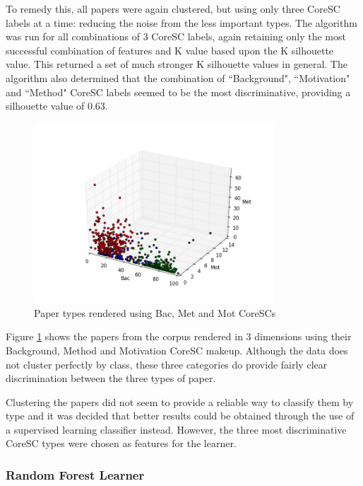 To remedy this, all papers were again clustered, but using only three CoreSC
labels at a time: reducing the noise from the less important types. The
algorithm was run for all combinations of 3 CoreSC labels, again retaining only
the most successful combination of features and K value based upon the K
silhouette value. This returned a set of much stronger K silhouette values in
general. The algorithm also determined that the combination of ``Background",
``Motivation" and ``Method" CoreSC labels seemed to be the most
discriminative, providing a silhouette value of 0.63. 

\begin{figure}[!ht]
\centering
\includegraphics[width=0.8\textwidth]{implementation/cluster.png}
\caption{Paper types rendered using Bac, Met and Mot CoreSCs}
\label{fig:clusters}
\end{figure}

Figure \ref{fig:clusters} shows the papers from the corpus rendered in 3
dimensions using their Background, Method and Motivation CoreSC makeup.
Although the data does not cluster perfectly by class, these three categories
do provide fairly clear discrimination between the three types of paper. 

Clustering the papers did not seem to provide a reliable way to classify them
by type and it was decided that better results could be obtained through the
use of a supervised learning classifier instead. However, the three most
discriminative CoreSC types were chosen as features for the learner.

\subsubsection{Random Forest Learner}

